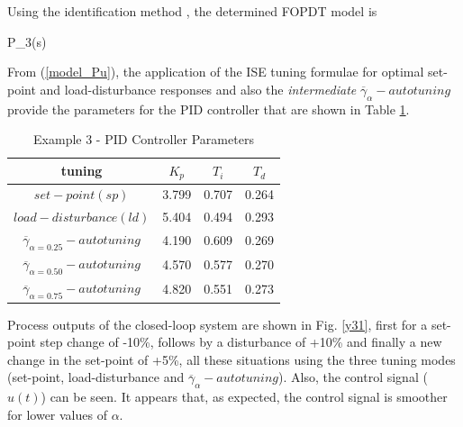 Using the identification method \cite{alfaro2006-1}, the
determined FOPDT model is

\be
    P_3(s) \approx {}
    \label{model_Pu}
\ee

From (\ref{model_Pu}), the application of the ISE tuning formulae
for optimal set-point and load-disturbance responses and also the
\emph{intermediate} $\overline{\gamma}_{\alpha}-autotuning$
provide the parameters for the PID controller that are shown in
Table \ref{PID_parameters3}.

\begin{table}[h!]
\begin{center}
\caption{Example 3 - PID Controller Parameters}
\begin{tabular}{c|ccc}
\hline \textbf{tuning}               &$K_p$ &$T_i$ &$T_d$\\ \hline
$set-point(sp)$                               &3.799  &0.707  &0.264 \\
$load-disturbance(ld)$                        &5.404  &0.494  &0.293 \\
\hline
$\overline{\gamma}_{\alpha=0.25}-autotuning$  &4.190  &0.609  &0.269 \\
$\overline{\gamma}_{\alpha=0.50}-autotuning$  &4.570  &0.577  &0.270 \\
$\overline{\gamma}_{\alpha=0.75}-autotuning$  &4.820  &0.551  &0.273 \\
\hline
\end{tabular}
\label{PID_parameters3}
\end{center}
\end{table}

Process outputs of the closed-loop system are shown in Fig.
\ref{y31}, first for a set-point step change of -10\%, follows by
a disturbance of +10\% and finally a new change in the set-point
of +5\%, all these situations using the three tuning modes
(set-point, load-disturbance and
$\overline{\gamma}_{\alpha}-autotuning$). Also, the control signal
($u(t)$) can be seen. It appears that, as expected, the control
signal is smoother for lower values of $\alpha$.

